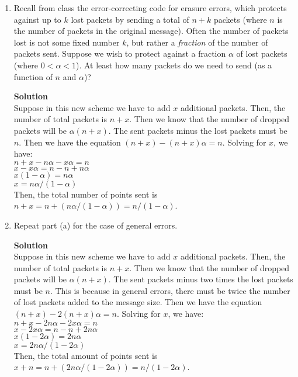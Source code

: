 \documentclass[11pt]{article}
\newenvironment{Parts}{\begin{enumerate}[label=(\alph*)]}{\end{enumerate}}
\newcommand*{\Part}{\item}
\begin{document}
\begin{Parts}
\renewcommand{\labelenumi}{(\alph{enumi})}
    \Part
    Recall from class the error-correcting code for erasure errors, which
    protects against up to $k$ lost packets by sending a total of $n+k$ packets
    (where $n$ is the number of packets in the original message).  Often the number
    of packets lost is not some fixed number $k$, but rather a \emph{fraction} of
    the number of packets sent.  Suppose we wish to protect against a fraction
    $\alpha$ of lost packets (where $0 < \alpha < 1$).  At least how many packets do 
    we need to send (as a function of $n$ and $\alpha$)?
\begin{mdframed} \textbf{Solution} \\
Suppose in this new scheme we have to add $x$ additional packets. Then, the number of total packets is $n+x$. Then we know that the number of dropped packets will be $\alpha(n+x)$. The sent packets minus the lost packets must be $n$. Then we have the equation $(n+x)-(n+x)\alpha=n$. Solving for $x$, we have: \\
$n+x-n\alpha-x\alpha=n$ \\
$x-x\alpha=n-n+n\alpha$ \\
$x(1-\alpha)=n\alpha$ \\
$x=n\alpha / (1-\alpha)$ \\
Then, the total number of points sent is $n+x=n+(n\alpha/(1-\alpha))=n/(1-\alpha)$.
\end{mdframed}

    \Part
    Repeat part (a) for the case of general errors.
\begin{mdframed} \textbf{Solution} \\
Suppose in this new scheme we have to add $x$ additional packets. Then, the number of total packets is $n+x$. Then we know that the number of dropped packets will be $\alpha(n+x)$. The sent packets minus two times the lost packets must be $n$. This is because in general errors, there must be twice the number of lost packets added to the message size. Then we have the equation $(n+x)-2(n+x)\alpha=n$. Solving for $x$, we have: \\
$n+x-2n\alpha-2x\alpha=n$ \\
$x-2x\alpha=n-n+2n\alpha$ \\
$x(1-2\alpha)=2n\alpha$ \\
$x=2n\alpha / (1-2\alpha)$ \\
Then, the total amount of points sent is $x+n=n+(2n\alpha / (1-2\alpha))=n/(1-2\alpha)$.
\end{mdframed}
\end{Parts}
\end{document}
